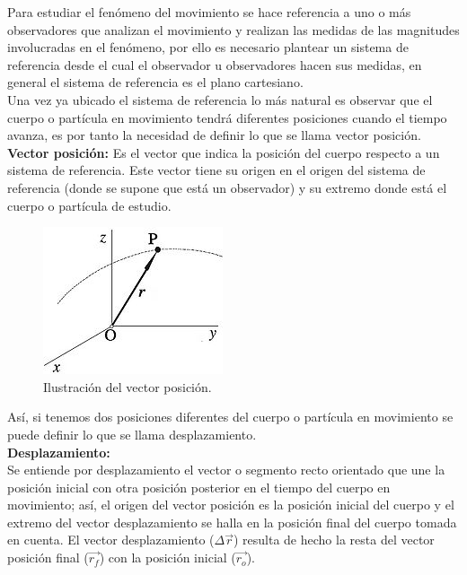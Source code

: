 Para estudiar el fenómeno del movimiento se hace referencia a uno o más observadores que analizan el movimiento y realizan las 
medidas de las magnitudes involucradas en el fenómeno, por ello es necesario plantear un sistema de referencia desde el cual el 
observador u observadores hacen sus medidas, en general el sistema de referencia es el plano cartesiano.\\

Una vez ya ubicado el sistema de referencia lo más natural es observar que el cuerpo o partícula en movimiento tendrá diferentes 
posiciones cuando el tiempo avanza, es por tanto la necesidad de definir lo que se llama vector posición.\\ 

\textbf{Vector posición:} Es el vector que indica la posición del cuerpo respecto a un sistema de referencia. Este vector tiene 
su origen en el origen del sistema de referencia (donde se supone que está un observador) y su extremo donde está el cuerpo o 
partícula de estudio.

\begin{figure}[ht]
 \centering
 \includegraphics[scale=0.6]{images/posicion.jpg}
 \caption{Ilustración del vector posición.}
\end{figure}

Así, si tenemos dos posiciones diferentes del cuerpo o partícula en movimiento se puede definir lo que se llama desplazamiento.\\

\textbf{Desplazamiento:}\\

Se entiende por desplazamiento el vector o segmento recto orientado que une la posición inicial con otra posición posterior en el 
tiempo del cuerpo en movimiento; así, el origen del vector posición es la posición inicial del cuerpo y el extremo del vector 
desplazamiento se halla en la posición final del cuerpo tomada en cuenta. El vector desplazamiento ($\Delta \vec{r}$) resulta de 
hecho la resta del vector posición final ($\vec{r_f}$) con la posición inicial ($\vec{r_o}$).

